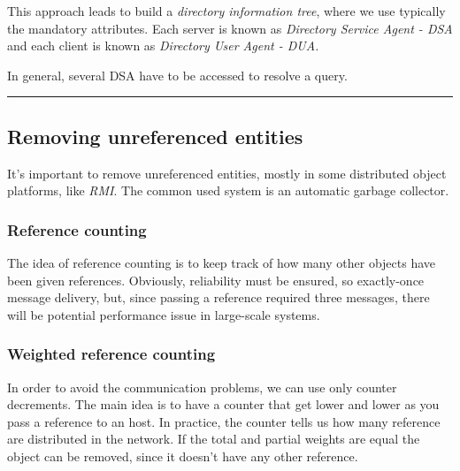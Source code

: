 This approach leads to build a \emph{directory information tree}, where
we use typically the mandatory attributes.
Each server is known as \emph{Directory Service Agent - DSA} and each client is known as \emph{Directory User Agent - DUA.}

In general, several DSA have to be accessed to resolve a query.

\begin{center}\rule{3in}{0.4pt}\end{center}

\subsection{Removing unreferenced entities}

It's important to remove unreferenced entities, mostly in some
distributed object platforms, like \textit{RMI}. The common used system is an
automatic garbage collector.

\subsubsection{Reference counting}

The idea of reference counting is to keep track of how many other
objects have been given references. Obviously, reliability must be
ensured, so exactly-once message delivery, but, since passing a
reference required three messages, there will be potential performance
issue in large-scale systems.

\subsubsection{Weighted reference counting}\label{weighted-reference-counting}

In order to avoid the communication problems, we can use only counter
decrements. The main idea is to have a counter that get lower and lower
as you pass a reference to an host. In practice, the counter tells us
how many reference are distributed in the network. If the total and
partial weights are equal the object can be removed, since it doesn't
have any other reference.

